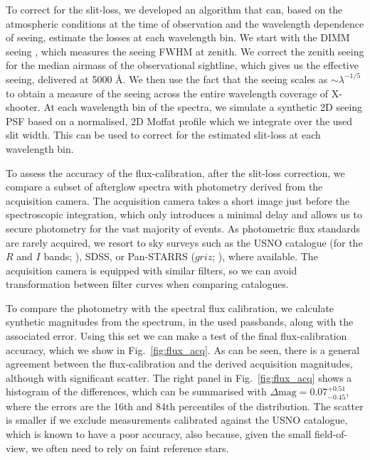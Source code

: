 \documentclass[longauth]{aa}    %
\begin{document}
To correct for the slit-loss, we developed an algorithm that can, based on the
atmospheric conditions at the time of observation and the wavelength dependence
of seeing, estimate the losses at each wavelength bin. We start with the DIMM
seeing \citep{Sarazin1990}, which measures the seeing FWHM at zenith. We correct
the zenith seeing for the median airmass of the observational sightline, which
gives us the effective seeing, delivered at 5000 \AA. We then use the fact that the
seeing scales as $\sim \lambda^{-1/5}$ to obtain a measure of the seeing across
the entire wavelength coverage of X-shooter. At each wavelength bin of the
spectra, we simulate a synthetic 2D seeing PSF based on a normalised, 2D Moffat
profile which we integrate over the used slit width. This can be used to correct
for the estimated slit-loss at each wavelength bin.

To assess the accuracy of the flux-calibration, after the slit-loss correction,
we compare a subset of afterglow spectra with photometry derived from the
acquisition camera. The acquisition camera takes a short image just before the
spectroscopic integration, which only introduces a minimal delay and allows us
to secure photometry for the vast majority of events. As photometric flux
standards are rarely acquired, we resort to sky surveys such as the USNO catalogue
(for the $R$ and $I$ bands; \citealt{Monet2003}), SDSS, or Pan-STARRS ($griz$;
\citealt{Abolfathi2018,Chambers2016}), where available. The acquisition camera
is equipped with similar filters, so we can avoid transformation between filter
curves when comparing catalogues.

To compare the photometry with the spectral flux calibration,
we calculate synthetic magnitudes from the spectrum, in the used passbands,
along with the associated error. Using this set we can make a test of the final flux-calibration accuracy, which
we show in Fig.~\ref{fig:flux_acq}. As can be seen, there is a general agreement
between the flux-calibration and the derived acquisition magnitudes, although
with significant scatter. The right panel in Fig.~\ref{fig:flux_acq} shows a
histogram of the differences, which can be summarised with $\Delta \mathrm{mag}
= 0.07 ^{+0.51} _{-0.45} $, where the errors are the 16th and 84th percentiles of
the distribution. The scatter is smaller if we exclude measurements calibrated against the USNO catalogue, which is known to have a poor accuracy, also because, given the small field-of-view, we often need to rely on faint reference stars.
\end{document}
